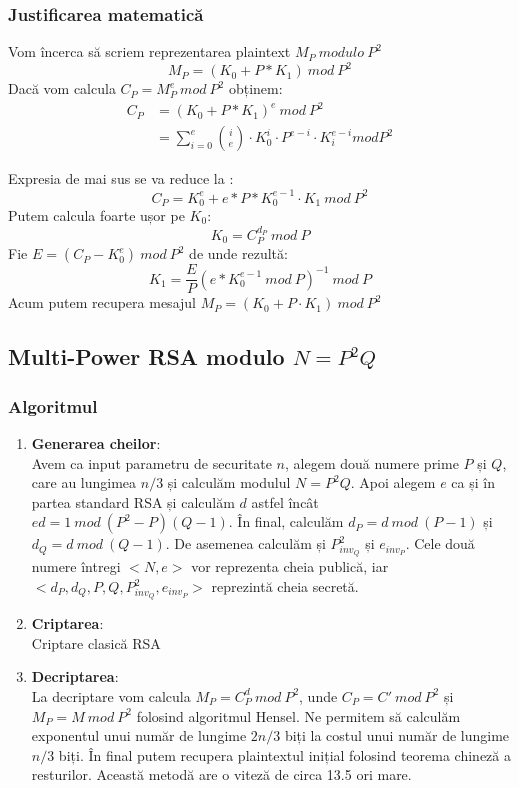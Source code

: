 \documentclass[12]{report}
\begin{document}
		  \subsubsection{Justificarea matematică}
		  Vom încerca să scriem reprezentarea plaintext $M_P \ modulo \ P^2$
		  $$ M_P=(K_0 + P*K_1) \ mod \ P^2$$
		  Dacă vom calcula $C_P = M_{P}^{e} \ mod \ P^2$ obținem:
		  \begin{align*}
		   C_P &= (K_0 + P*K_1)^e \ mod \ P^2 \\
		   &= \sum_{i=0}^{e} \binom ie \cdot   K_{0}^{i} \cdot   P^{e-i} \cdot   K_{i}^{e-i} mod P^2 
		  \end{align*}
		  
		  Expresia de mai sus se va reduce la :
		  $$ C_P = K_{0}^{e}  + e*P*K_{0}^{e-1} \cdot   K_1 \ mod \ P^2 $$
		  Putem calcula foarte ușor pe $K_0$:
		  $$K_0=C_{P}^{d_P} \ mod \ P$$
		  Fie $E = (C_P - K_{0}^{e}) \ mod \ P^2$ de unde rezultă:
		  $$ K_1=\frac{E}{P} (e*K_{0}^{e-1} \ mod \ P)^{-1} \ mod \ P $$
		  Acum putem recupera mesajul $M_P = (K_0 + P \cdot   K_1) \ mod \ P^2$
		  
		  \subsection{Multi-Power RSA modulo $N=P^2Q$}
		  \subsubsection{Algoritmul}
		  \begin{enumerate}
		   \item \textbf{Generarea cheilor}: \\
		   Avem ca input parametru de securitate $n$, alegem două numere prime $P$ și $Q$, care au lungimea $n/3$ și calculăm modulul $N=P^2Q$. Apoi alegem $e$ ca și în partea standard RSA și calculăm $d$ astfel încât $ed=1 \ mod \ (P^2-P)(Q-1)$. În final, calculăm $d_P= d \ mod \ (P-1)$ și $ d_Q=d \ mod \ (Q-1)$. De asemenea calculăm și $P_{inv_Q}^{2}$ și $e_{inv_P}$. Cele două numere întregi $<N,e>$ vor reprezenta cheia publică, iar $<d_P,d_Q,P,Q,P_{inv_Q}^{2},e_{inv_P}>$ reprezintă cheia secretă. 
		   
		   \item \textbf{Criptarea}: \\
		   Criptare clasică RSA
		   
		   \item \textbf{Decriptarea}: \\
		   La decriptare vom calcula $M_P = C_{P}^{d} \ mod \ P^2$, unde $C_P = C '\ mod \ P^2$ și $M_P = M \ mod \ P^2$ folosind algoritmul Hensel. Ne permitem să calculăm exponentul unui număr de lungime $2n/3$ biți la costul unui număr de lungime $n/3$ biți. În final putem recupera plaintextul inițial folosind teorema chineză a resturilor. Această metodă are o viteză de circa 13.5 ori mare.
		  \end{enumerate}
		  
\end{document}
